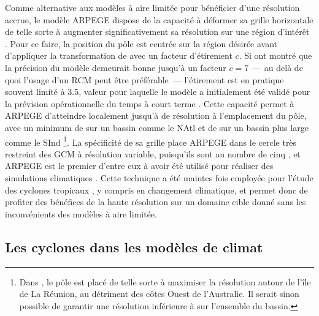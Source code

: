 \documentclass[../main.tex]{subfiles}
\begin{document}
Comme alternative aux modèles à aire limitée pour bénéficier d'une résolution accrue, le modèle ARPEGE dispose de la capacité à déformer sa grille horizontale
de telle sorte à augmenter significativement sa résolution sur une région d'intérêt \parencite{courtier_global_1988}. Pour ce faire, la position du pôle est
centrée sur la région désirée avant d'appliquer la transformation de \cite{schmidt_variable_1977} avec un facteur d'étirement $c$. Si \cite{caian_limits_1997}
ont montré que la précision du modèle demeurait bonne jusqu'à un facteur $c=7$ ---~au delà de quoi l'usage d'un RCM peut être préférable~--- l'étirement est en
pratique souvent limité à \num{3.5}, valeur pour laquelle le modèle a initialement été validé pour la prévision opérationnelle du temps à court terme
\parencite{benichou_validation_1992}. Cette capacité permet à ARPEGE d'atteindre localement jusqu'à  de résolution à l'emplacement du pôle, avec un
minimum de  sur un bassin comme le NAtl \parencite[][c.f \cref{fig:rotated_streched}]{chauvin_future_2020} et de  sur un bassin plus large comme
le SInd \parencite{cattiaux_projected_2020}\footnote{Dans \cite{cattiaux_projected_2020}, le pôle est placé de telle sorte à maximiser la résolution autour de l'île
de La Réunion, au détriment des côtes Ouest de l'Australie. Il serait sinon possible de garantir une résolution inférieure à  sur l'ensemble du bassin.}.
La spécificité de sa grille place ARPEGE dans le cercle très restreint des GCM à résolution variable, puisqu'ils sont au nombre de cinq
\parencite{mcgregor_recent_2013}, et ARPEGE est le premier d'entre eux à avoir été utilisé pour réaliser des simulations climatiques
\parencite{deque_high_1995}. Cette technique a été maintes fois employée pour l'étude des cyclones tropicaux
\parencite{chauvin_response_2006,chauvin_atlantic_2017,chauvin_future_2020,daloz_impact_2012,cattiaux_projected_2020}, y compris en changement climatique, et
permet donc de profiter des bénéfices de la haute résolution sur un domaine cible donné sans les inconvénients des modèles à aire limitée.

\subsection{Les cyclones dans les modèles de climat}\label{sec:cyclones_dans_modèles}
\end{document}
